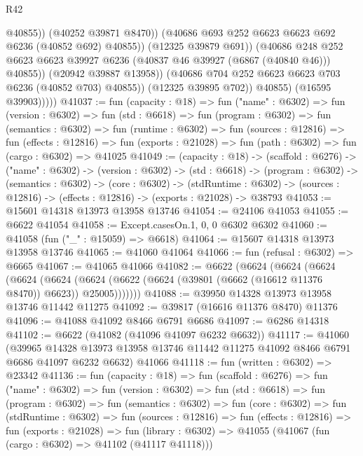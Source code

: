 \begin{lexlean}{R42}
\begin{coremodule}
{                                @40855))
                            (@40252 @39871 @8470))
                          (@40686 @693 @252 @6623 @6623 @692 @6236 (@40852 @692) @40855))
                        (@12325 @39879 @691))
                      (@40686
                        @248
                        @252
                        @6623
                        @6623
                        @39927
                        @6236
                        (@40837 @46 @39927 (@6867 (@40840 @46)))
                        @40855))
                    (@20942 @39887 @13958))
                  (@40686 @704 @252 @6623 @6623 @703 @6236 (@40852 @703) @40855))
                (@12325 @39895 @702))
              @40855)
            (@16595 @39903)))))
@41037 := fun (capacity : @18) =>
  fun ("name" : @6302) =>
  fun (version : @6302) =>
  fun (std : @6618) =>
  fun (program : @6302) =>
  fun (semantics : @6302) =>
  fun (runtime : @6302) =>
  fun (sources : @12816) =>
  fun (effects : @12816) =>
  fun (exports : @21028) => fun (path : @6302) => fun (cargo : @6302) => @41025
@41049 := (capacity : @18) ->
  (scaffold : @6276) ->
  ("name" : @6302) ->
  (version : @6302) ->
  (std : @6618) ->
  (program : @6302) ->
  (semantics : @6302) ->
  (core : @6302) ->
  (stdRuntime : @6302) -> (sources : @12816) -> (effects : @12816) -> (exports : @21028) -> @38793
@41053 := @15601 @14318 @13973 @13958 @13746
@41054 := @24106 @41053
@41055 := @6622 @41054
@41058 := Except.casesOn.{1, 0, 0} @6302 @6302
@41060 := @41058 (fun ("_" : @15059) => @6618)
@41064 := @15607 @14318 @13973 @13958 @13746
@41065 := @41060 @41064
@41066 := fun (refusal : @6302) => @6665
@41067 := @41065 @41066
@41082 := @6622
    (@6624
      (@6624
        (@6624
          (@6624
            (@6624 (@6624 (@6622 (@6624 (@39801 (@6662 (@16612 @11376 @8470)) @6623)) @25005)))))))
@41088 := @39950 @14328 @13973 @13958 @13746 @11442 @11275
@41092 := @39817 (@16616 @11376 @8470) @11376
@41096 := @41088 @41092 @8466 @6791 @6686
@41097 := @6286 @14318
@41102 := @6622 (@41082 (@41096 @41097 @6232 @6632))
@41117 := @41060
    (@39965 @14328 @13973 @13958 @13746 @11442 @11275 @41092 @8466 @6791 @6686 @41097 @6232 @6632)
    @41066
@41118 := fun (written : @6302) => @23342
@41136 := fun (capacity : @18) =>
  fun (scaffold : @6276) =>
  fun ("name" : @6302) =>
  fun (version : @6302) =>
  fun (std : @6618) =>
  fun (program : @6302) =>
  fun (semantics : @6302) =>
  fun (core : @6302) =>
  fun (stdRuntime : @6302) =>
  fun (sources : @12816) =>
  fun (effects : @12816) =>
  fun (exports : @21028) =>
  fun (library : @6302) => @41055 (@41067 (fun (cargo : @6302) => @41102 (@41117 @41118)))
}
\end{coremodule}
\end{lexlean}
